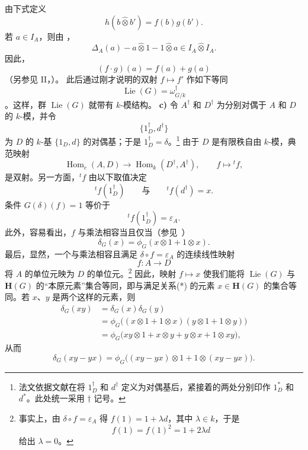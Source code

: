 由下式定义
\[
  h(b\widehat\otimes b')=f(b)g(b').
\]
若 \(a\in I_A\)，则由 \textup{}，
\[
  \Delta_A(a)-a\widehat\otimes1-1\widehat\otimes a
  \in
  I_A\widehat\otimes I_A.
\]
因此，
\[
  (f\cdot g)(a)=f(a)+g(a)
\]
\textup{（另参见 II，）}。
此后通过刚才说明的双射 \(f\mapsto f'\) 作如下等同
\[
  \operatorname{Lie}(G)=\omega_{G/k}^{\dagger}
\]
。这样，群 \(\operatorname{Lie}(G)\) 就带有 \(k\)-模结构。
\medskip
\noindent{}\textbf{c)}
令 \(A^\dagger\) 和 \(D^\dagger\) 为分别对偶于 \(A\) 和 \(D\) 的 \(k\)-模，并令
\[
  \{1_D^\dagger,d^\dagger\}
\]
为 \(D\) 的 \(k\)-基 \(\{1_D,d\}\) 的对偶基；于是 \(1_D^\dagger=\delta\)。\footnote{法文依据文献在将 \(1_D^\dagger\) 和 \(d^\dagger\) 定义为对偶基后，紧接着的两处分别印作 \(1_D^*\) 和 \(d^*\)。此处统一采用 \(\dagger\) 记号。}
由于 \(D\) 是有限秩自由 \(k\)-模，典范映射
\[
  \operatorname{Hom}_c(A,D)
  \longrightarrow
  \operatorname{Hom}_k(D^\dagger,A^\dagger),
  \qquad
  f\longmapsto{}^t f,
\]
是双射。另一方面，\({}^t f\) 由以下取值决定
\[
  {}^t f(1_D^\dagger)
  \qquad\text{与}\qquad
  {}^t f(d^\dagger)=x.
\]
条件 \(G(\delta)(f)=1\) 等价于
\[
  {}^t f(1_D^\dagger)=\varepsilon_A.
\]
此外，容易看出，\(f\) 与乘法相容当且仅当\textup{（参见\ ）}
\[
  \tag{*}
  \label{sga3:VIIB:2.6:primitive-relation}
  \delta_G(x)=\phi_G(x\otimes1+1\otimes x).
\]
最后，显然，一个与乘法相容且满足 \(\delta\circ f=\varepsilon_A\) 的连续线性映射
\[
  f:A\longrightarrow D
\]
将 \(A\) 的单位元映为 \(D\) 的单位元。\footnote{\label{sga3:VIIB:nde:107}事实上，由 \(\delta\circ f=\varepsilon_A\) 得 \(f(1)=1+\lambda d\)，其中 \(\lambda\in k\)，于是
\[
  f(1)=f(1)^2=1+2\lambda d
\]
给出 \(\lambda=0\)。}
因此，映射 \(f\mapsto x\) 使我们能将 \(\operatorname{Lie}(G)\) 与 \(\mathbf H(G)\) 的“本原元素”集合等同，即与满足关系\textup{(*)} 的元素 \(x\in\mathbf H(G)\) 的集合等同。若 \(x\)、\(y\) 是两个这样的元素，则
\[
\begin{aligned}
  \delta_G(xy)
  &=
  \delta_G(x)\delta_G(y)
  \\
  &=
  \phi_G\bigl(
    (x\otimes1+1\otimes x)
    (y\otimes1+1\otimes y)
  \bigr)
  \\
  &=
  \phi_G\bigl(
    xy\otimes1+x\otimes y+y\otimes x+1\otimes xy
  \bigr),
\end{aligned}
\]
从而
\[
  \delta_G(xy-yx)
  =
  \phi_G\bigl(
    (xy-yx)\otimes1+1\otimes(xy-yx)
  \bigr).
\]
